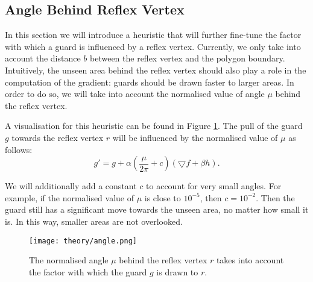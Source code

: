 \subsection{Angle Behind Reflex Vertex}
\label{sec:angle}
In this section we will introduce a heuristic that will further fine-tune the factor with which a guard is influenced by a reflex vertex. Currently, we only take into account the distance $b$ between the reflex vertex and the polygon boundary. Intuitively, the unseen area behind the reflex vertex should also play a role in the computation of the gradient: guards should be drawn faster to larger areas. In order to do so, we will take into account the normalised value of angle $\mu$ behind the reflex vertex.

A visualisation for this heuristic can be found in Figure \ref{fig:angle}. The pull of the guard $g$ towards the reflex vertex $r$ will be influenced by the normalised value of $\mu$ as follows: $$g' = g + \alpha (\frac{\mu}{2\pi} + c)(\bigtriangledown f + \beta h).$$

We will additionally add a constant $c$ to account for very small angles. For example, if the normalised value of $\mu$ is close to $10^{-5}$, then $c = 10^{-2}$. Then the guard still has a significant move towards the unseen area, no matter how small it is. In this way, smaller areas are not overlooked.

\begin{figure}[h!]
    \centering
    \texttt{[image: theory/angle.png]}
    \caption{The normalised angle $\mu$ behind the reflex vertex $r$ takes into account the factor with which the guard $g$ is drawn to $r$.}
    \label{fig:angle}
\end{figure}
